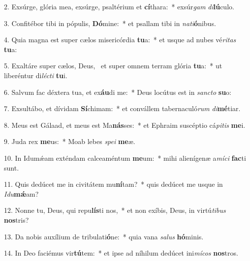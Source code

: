 2. Exsúrge, glória mea, exsúrge, psaltérium et \textbf{cí}thara:~*  exsúr\textit{gam} \textit{di}\textbf{lú}culo.\

3. Confitébor tibi in pópulis, \textbf{Dó}mine:~*  et psallam tibi in \textit{na}\textit{ti}\textbf{ó}nibus.\

4. Quia magna est super cælos misericórdia \textbf{tu}a:~*  et usque ad nubes vé\textit{ri}\textit{tas} \textbf{tu}a:\

5. Exaltáre super cælos, Deus, \dag\  et super omnem terram glória \textbf{tu}a:~*  ut liberéntur di\textit{léc}\textit{ti} \textbf{tu}i.\

6. Salvum fac déxtera tua, et ex\textbf{áu}di me:~*  Deus locútus est in \textit{sanc}\textit{to} \textbf{su}o:\

7. Exsultábo, et dívidam \textbf{Sí}chimam:~*  et convállem tabernaculó\textit{rum} \textit{di}\textbf{mé}tiar.\

8. Meus est Gálaad, et meus est Ma\textbf{nás}ses:~*  et Ephraim suscéptio cá\textit{pi}\textit{tis} \textbf{me}i.\

9. Juda rex \textbf{me}us:~*  Moab lebes \textit{spe}\textit{i} \textbf{me}æ.\

10. In Idumǽam exténdam calceaméntum \textbf{me}um:~*  mihi alienígenæ a\textit{mí}\textit{ci} \textbf{fac}ti sunt.\

11. Quis dedúcet me in civitátem mu\textbf{ní}tam?~*  quis dedúcet me usque in \textit{I}\textit{du}\textbf{mǽ}am?\

12. Nonne tu, Deus, qui repu\textbf{lís}ti nos,~*  et non exíbis, Deus, in virtú\textit{ti}\textit{bus} \textbf{nos}tris?\

13. Da nobis auxílium de tribulati\textbf{ó}ne:~*  quia vana \textit{sa}\textit{lus} \textbf{hó}minis.\

14. In Deo faciémus vir\textbf{tú}tem:~*  et ipse ad níhilum dedúcet ini\textit{mí}\textit{cos} \textbf{nos}tros.\

